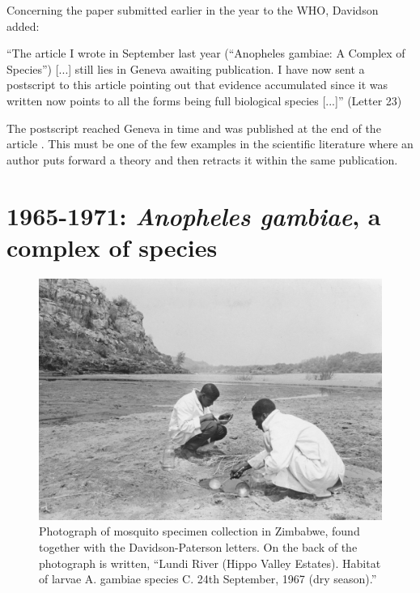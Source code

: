 \documentclass[a4paper,11pt,abstracton,hidelinks]{scrartcl}
\begin{document}
Concerning the paper submitted earlier in the year to the WHO, Davidson added:


\begin{displayquote}
``The article I wrote in September last year (``Anopheles gambiae: A Complex of Species'') [...] still lies in Geneva awaiting publication. I have now sent a postscript to this article pointing out that evidence accumulated since it was written now points to all the forms being full biological species [...]'' (Letter 23)
\end{displayquote}


The postscript reached Geneva in time and was published at the end of the article \citep{Davidson1964}. This must be one of the few examples in the scientific literature where an author puts forward a theory and then retracts it within the same publication.


\section{1965-1971: \textit{Anopheles gambiae}, a complex of species}


\begin{figure}[t]
\centering
\includegraphics[width=\textwidth]{davidson-letters/Photo-Zimbabwe-Lundi.pdf}
\caption{Photograph of mosquito specimen collection in Zimbabwe, found together with the Davidson-Paterson letters. On the back of the photograph is written, ``Lundi River (Hippo Valley Estates). Habitat of larvae A. gambiae species C. 24th September, 1967 (dry season).''}
\end{figure}
\end{document}
